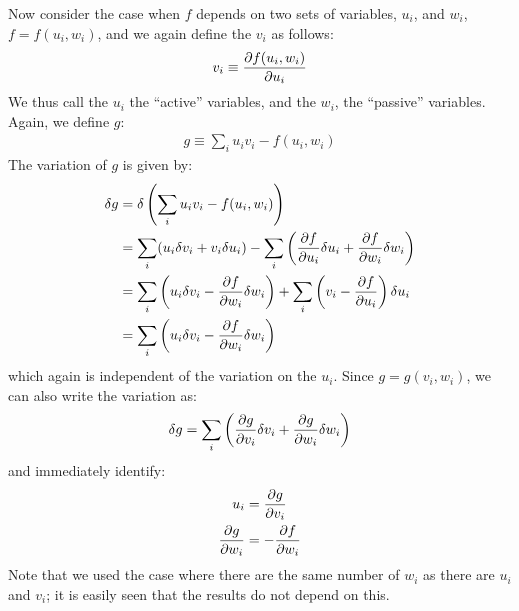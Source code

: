 Now consider the case when $f$ depends on two sets of variables, $u_i$, and $w_i$, $f=f(u_i,w_i)$, and we again define the $v_i$ as follows:
\begin{align}
v_i\equiv \frac{\partial f(u_i,w_i)}{\partial u_i}
\end{align}
We thus call the $u_i$ the ``active'' variables, and the $w_i$, the ``passive'' variables.
Again, we define $g$:
\begin{align}
g \equiv \sum_i u_iv_i-f(u_i,w_i)
\end{align}
The variation of $g$ is given by:
\begin{align}
\delta g &= \delta \left(\sum_i u_iv_i-f(u_i,w_i)\right)\nonumber\\
&=\sum_i (u_i\delta v_i+v_i\delta u_i)-\sum_i \left(\frac{\partial f}{\partial u_i}\delta u_i+ \frac{\partial f}{\partial w_i}\delta w_i\right) \nonumber\\
&=\sum_i \left(u_i\delta v_i-\frac{\partial f}{\partial w_i}\delta w_i\right) + \sum_i\left(v_i-\frac{\partial f}{\partial u_i} \right)\delta u_i\nonumber\\
&=\sum_i \left( u_i\delta v_i-\frac{\partial f}{\partial w_i}\delta w_i \right)
\end{align}
which again is independent of the variation on the $u_i$. Since $g=g(v_i,w_i)$, we can also write the variation as:
\begin{align}
\delta g = \sum_i \left(\frac{\partial g}{\partial v_i}\delta v_i+\frac{\partial g}{\partial w_i} \delta w_i \right)
\end{align}
and immediately identify:
\begin{align}
u_i&=\frac{\partial g}{\partial v_i}\nonumber\\
\frac{\partial g}{\partial w_i}&=-\frac{\partial f}{\partial w_i}
\end{align}
Note that we used the case where there are the same number of $w_i$ as there are $u_i$ and $v_i$; it is easily seen that the results do not depend on this. 


